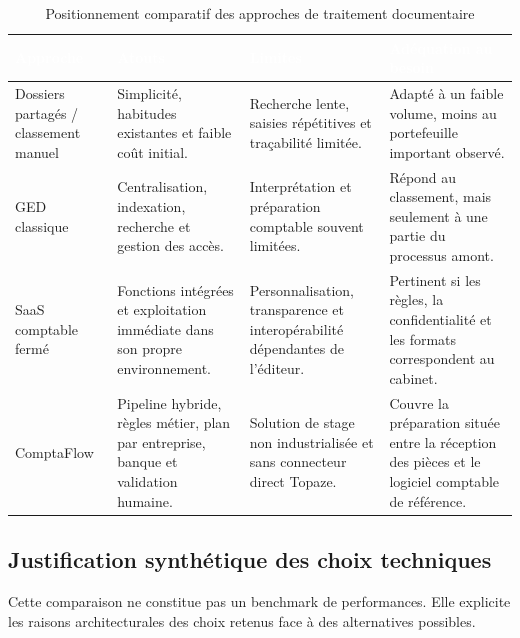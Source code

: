 \documentclass[12pt,a4paper,oneside]{report}
\newcommand{\TableSetup}{%
  \arrayrulecolor{ComptaTableLine}%
  \setlength{\arrayrulewidth}{0.45pt}%
  \renewcommand{\arraystretch}{1.18}%
}
\newcommand{\TableHead}[1]{\textcolor{white}{\textbf{#1}}}
\begin{document}
\begin{table}[H]
\centering
\caption{Positionnement comparatif des approches de traitement documentaire}
\footnotesize
\TableSetup
\begin{tabularx}{\textwidth}{|L{3.1cm}|L{3.7cm}|L{3.7cm}|Y|}
\toprule
{}\TableHead{Approche} & \TableHead{Atouts} & \TableHead{Limites} & \TableHead{Adéquation au besoin} \\
\midrule
Dossiers partagés / classement manuel & Simplicité, habitudes existantes et faible coût initial. & Recherche lente, saisies répétitives et traçabilité limitée. & Adapté à un faible volume, moins au portefeuille important observé. \\
GED classique & Centralisation, indexation, recherche et gestion des accès. & Interprétation et préparation comptable souvent limitées. & Répond au classement, mais seulement à une partie du processus amont. \\
SaaS comptable fermé & Fonctions intégrées et exploitation immédiate dans son propre environnement. & Personnalisation, transparence et interopérabilité dépendantes de l'éditeur. & Pertinent si les règles, la confidentialité et les formats correspondent au cabinet. \\
ComptaFlow & Pipeline hybride, règles métier, plan par entreprise, banque et validation humaine. & Solution de stage non industrialisée et sans connecteur direct Topaze. & Couvre la préparation située entre la réception des pièces et le logiciel comptable de référence. \\
\bottomrule
\end{tabularx}
\end{table}

\subsection{Justification synthétique des choix techniques}

Cette comparaison ne constitue pas un benchmark de performances. Elle explicite
les raisons architecturales des choix retenus face à des alternatives possibles.
\end{document}
